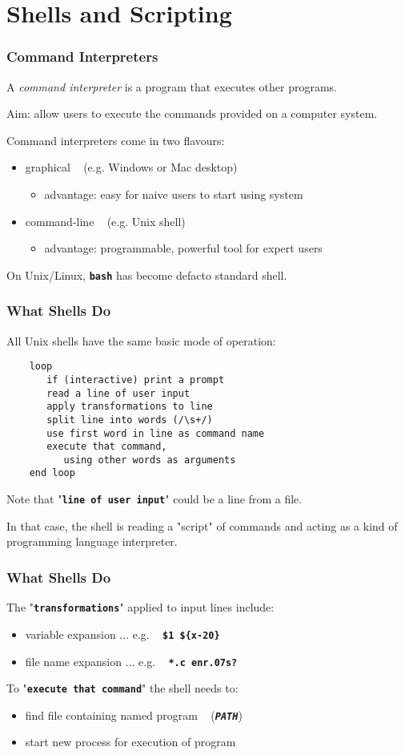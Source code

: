 

\section{Shells and Scripting}
\begin{frame}
\frametitle{Command Interpreters}
A {\em{command interpreter}} is a program that executes other programs.

Aim: allow users to execute the commands provided on a computer system.

Command interpreters come in two flavours:
\begin{itemize}
\item  graphical ~ (e.g. Windows or Mac desktop)
\begin{itemize}
\item  advantage: easy for naive users to start using system
\end{itemize}
\item  command-line ~ (e.g. Unix shell)
\begin{itemize}
\item  advantage: programmable, powerful tool for expert users
\end{itemize}
\end{itemize}
On Unix/Linux, \textbf{\tt{bash}} has become defacto standard shell.
\end{frame}

\begin{frame}[fragile]
\frametitle{What Shells Do}
All Unix shells have the same basic mode of operation:
\begin{verbatim}
    loop
       if (interactive) print a prompt
       read a line of user input
       apply transformations to line
       split line into words (/\s+/)
       use first word in line as command name
       execute that command,
          using other words as arguments
    end loop
\end{verbatim}

Note that "\textbf{\tt{line of user input}}" could be a line from a file.

In that case, the shell is reading a "script" of commands
and acting as a kind of programming language interpreter.
\end{frame}

\begin{frame}
\frametitle{What Shells Do}
The "\textbf{\tt{transformations}}" applied to input lines include:
\begin{itemize}
\item  variable expansion ... e.g. ~ \textbf{\tt{\$1  \$\{x-20\}}}
\item  file name expansion ... e.g. ~ \textbf{\tt{*.c  enr.07s?}}
\end{itemize}
To "\textbf{\tt{execute that command}}" the shell needs to:
\begin{itemize}
\item  find file containing named program ~ ({\em{\textbf{\tt{PATH}}}})
\item  start new process for execution of program
\end{itemize}
\end{frame}

